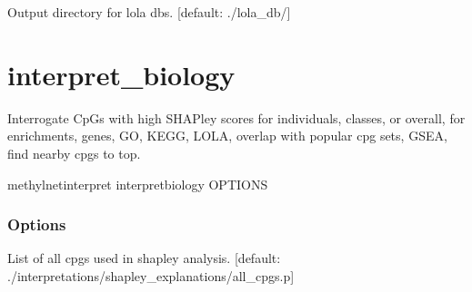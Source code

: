 \documentclass[letterpaper,10pt,english]{sphinxmanual}
\begin{document}
\begin{fulllineitems}
\label{\detokenize{index:cmdoption-methylnet-interpret-grab-lola-db-cache-o}}
Output directory for lola dbs.  {[}default: ./lola\_db/{]}

\end{fulllineitems}



\section{interpret\_biology}
\label{\detokenize{index:methylnet-interpret-interpret-biology}}
Interrogate CpGs with high SHAPley scores for individuals, classes, or overall, for enrichments, genes, GO, KEGG, LOLA, overlap with popular cpg sets, GSEA, find nearby cpgs to top.

\begin{sphinxVerbatim}[commandchars=\\\{\}]
methylnet\PYGZhy{}interpret interpret\PYGZus{}biology \PYG{o}{[}OPTIONS\PYG{o}{]}
\end{sphinxVerbatim}
\subsubsection*{Options}

\begin{fulllineitems}
\label{\detokenize{index:cmdoption-methylnet-interpret-interpret-biology-a}}
List of all cpgs used in shapley analysis.  {[}default: ./interpretations/shapley\_explanations/all\_cpgs.p{]}

\end{fulllineitems}
\end{document}
